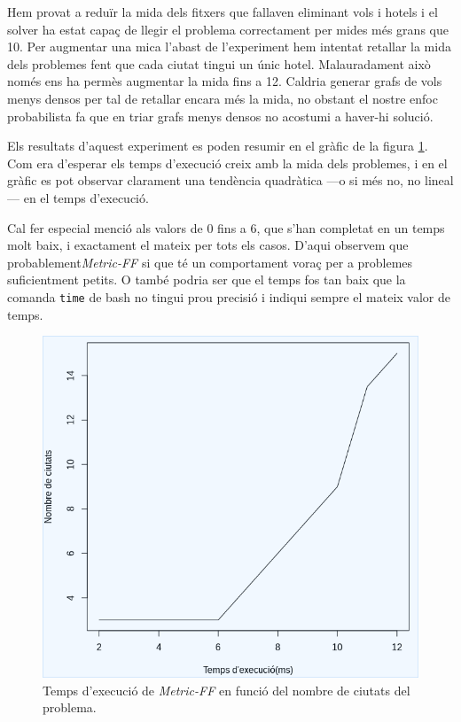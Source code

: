 \documentclass[11pt,a4paper]{article}
\begin{document}
Hem provat a reduïr la mida dels fitxers que fallaven eliminant vols i hotels i el solver ha estat capaç de llegir el problema correctament per mides més grans que 10. Per augmentar una mica l'abast de l'experiment hem intentat retallar la mida dels problemes fent que cada ciutat tingui un únic hotel. Malauradament això només ens ha permès augmentar la mida fins a 12. Caldria generar grafs de vols menys densos per tal de retallar encara més la mida, no obstant el nostre enfoc probabilista fa que en triar grafs menys densos no acostumi a haver-hi solució.

Els resultats d'aquest experiment es poden resumir en el gràfic de la figura \ref{fig:grafic_experiment}. Com era d'esperar els temps d'execució creix amb la mida dels problemes, i en el gràfic es pot observar clarament una tendència quadràtica ---o si més no, no lineal--- en el temps d'execució.  

Cal fer especial menció als valors de 0 fins a 6, que s'han completat en un temps molt baix, i exactament el mateix per tots els casos. D'aqui observem que probablement\emph{Metric-FF} si que té un comportament voraç per a problemes suficientment petits. O també podria ser que el temps fos tan baix que la comanda \texttt{time} de bash no tingui prou precisió i indiqui sempre el mateix valor de temps.

\begin{figure}[hbt]
\includegraphics[width=\textwidth]{./grafic_experiment.png}
\caption{Temps d'execució de \emph{Metric-FF} en funció del nombre de ciutats del problema.}
\label{fig:grafic_experiment}
\end{figure}
\end{document}
